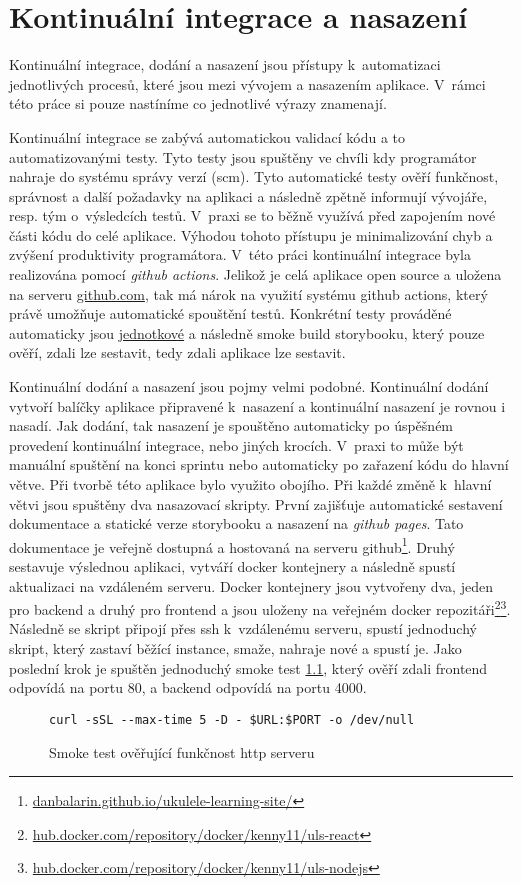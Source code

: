 \chapter{Kontinuální integrace a nasazení}
\label{ch:ci_cd}
Kontinuální integrace, dodání a nasazení jsou přístupy k~automatizaci jednotlivých procesů, které jsou mezi vývojem a nasazením aplikace. V~rámci této práce si pouze nastíníme co jednotlivé výrazy znamenají.

Kontinuální integrace se zabývá automatickou validací kódu a to automatizovanými testy. Tyto testy jsou spuštěny ve chvíli kdy programátor nahraje do systému správy verzí (\acrshort{scm}). Tyto automatické testy ověří funkčnost, správnost a další požadavky na aplikaci a následně zpětně informují vývojáře, resp. tým o~výsledcích testů. V~praxi se to běžně využívá před zapojením nové části kódu do celé aplikace. Výhodou tohoto přístupu je minimalizování chyb a zvýšení produktivity programátora. V~této práci kontinuální integrace byla realizována pomocí \emph{github actions}. Jelikož je celá aplikace open source a uložena na serveru \href{www.github.com}{github.com}, tak má nárok na využití systému github actions, který právě umožňuje automatické spouštění testů. Konkrétní testy prováděné automaticky jsou \hyperref[sc:unit_tests]{jednotkové} a následně smoke build storybooku, který pouze ověří, zdali lze sestavit, tedy zdali aplikace lze sestavit.

Kontinuální dodání a nasazení jsou pojmy velmi podobné. Kontinuální dodání vytvoří balíčky aplikace připravené k~nasazení a kontinuální nasazení je rovnou i nasadí. Jak dodání, tak nasazení je spouštěno automaticky po úspěšném provedení kontinuální integrace, nebo jiných krocích. V~praxi to může být manuální spuštění na konci sprintu nebo automaticky po zařazení kódu do hlavní větve. Při tvorbě této aplikace bylo využito obojího. Při každé změně k~hlavní větvi jsou spuštěny dva nasazovací skripty. První zajišťuje automatické sestavení dokumentace a statické verze storybooku a nasazení na \emph{github pages}. Tato dokumentace je veřejně dostupná a hostovaná na serveru github\footnote{\href{https://danbalarin.github.io/ukulele-learning-site/}{danbalarin.github.io/ukulele-learning-site/}}. Druhý sestavuje výslednou aplikaci, vytváří docker kontejnery a následně spustí aktualizaci na vzdáleném serveru. Docker kontejnery jsou vytvořeny dva, jeden pro backend a druhý pro frontend a jsou uloženy na veřejném docker repozitáři\footnote{\href{https://hub.docker.com/repository/docker/kenny11/uls-react}{hub.docker.com/repository/docker/kenny11/uls-react}}\footnote{\href{https://hub.docker.com/repository/docker/kenny11/uls-nodejs}{hub.docker.com/repository/docker/kenny11/uls-nodejs}}. Následně se skript připojí přes ssh k~vzdálenému serveru, spustí jednoduchý skript, který zastaví běžící instance, smaže, nahraje nové a spustí je. Jako poslední krok je spuštěn jednoduchý smoke test \ref{code:smoke}, který ověří zdali frontend odpovídá na portu 80, a backend odpovídá na portu 4000.

\begin{figure}[h!]
    \centering
    \begin{verbatim}
curl -sSL --max-time 5 -D - $URL:$PORT -o /dev/null
    \end{verbatim}
    \caption{Smoke test ověřující funkčnost http serveru}
    \label{code:smoke}
\end{figure}
